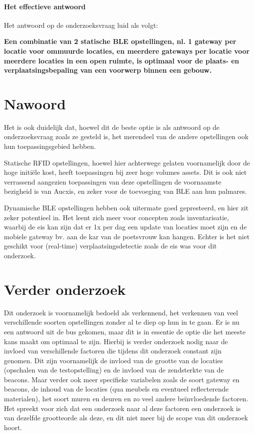 \paragraph{Het effectieve antwoord}
Het antwoord op de onderzoeksvraag luid als volgt:
\begin{center}
	\textbf{Een combinatie van 2 statische BLE opstellingen, nl. 1 gateway per locatie voor ommuurde locaties, en meerdere gateways per locatie voor meerdere locaties in een open ruimte, is optimaal voor de plaats- en verplaatsingsbepaling van een voorwerp binnen een gebouw.}
\end{center}

\section{Nawoord}
Het is ook duidelijk dat, hoewel dit de beste optie is als antwoord op de onderzoeksvraag zoals ze gesteld is, het merendeel van de andere opstellingen ook hun toepassingsgebied hebben. 

Statische RFID opstellingen, hoewel hier achterwege gelaten voornamelijk door de hoge initiële kost, heeft toepassingen bij zeer hoge volumes assets. Dit is ook niet verrassend aangezien toepassingen van deze opstellingen de voornaamste bezigheid is van Aucxis, en zeker voor de toevoeging van BLE aan hun palmares. 

Dynamische BLE opstellingen hebben ook uitermate goed gepresteerd, en hier zit zeker potentieel in. Het leent zich meer voor concepten zoals inventarisatie, waarbij de eis kan zijn dat er 1x per dag een update van locaties moet zijn en de mobiele gateway bv. aan de kar van de poetsvrouw kan hangen. Echter is het niet geschikt voor (real-time) verplaatsingsdetectie zoals de eis was voor dit onderzoek.

\section{Verder onderzoek}
Dit onderzoek is voornamelijk bedoeld als verkennend, het verkennen van veel verschillende soorten opstellingen zonder al te diep op hun in te gaan. Er is nu een antwoord uit de bus gekomen, maar dit is in essentie de optie die het meeste kans maakt om optimaal te zijn. Hierbij is verder onderzoek nodig naar de invloed van verschillende factoren die tijdens dit onderzoek constant zijn genomen. Dit zijn voornamelijk de invloed van de grootte van de locaties (opschalen van de testopstelling) en de invloed van de zendsterkte van de beacons. Maar verder ook meer specifieke variabelen zoals de soort gateway en beacons, de inhoud van de locaties (qua meubels en eventueel reflecterende materialen), het soort muren en deuren en zo veel andere beïnvloedende factoren. Het spreekt voor zich dat een onderzoek naar al deze factoren een onderzoek is van dezelfde grootteorde als deze, en dit niet meer bij de scope van dit onderzoek hoort.

